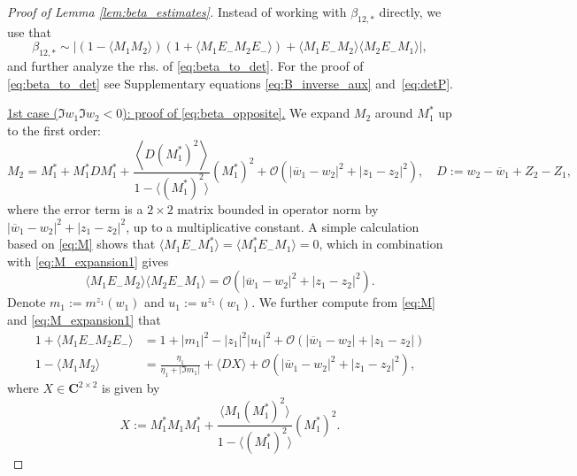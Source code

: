 \documentclass[10pt]{amsart}
\numberwithin{equation}{section}
\newcommand{\C}{\mathbf{C}}
\begin{document}
\begin{proof}[Proof of Lemma \ref{lem:beta_estimates}] Instead of working with $\beta_{12,*}$ directly, we use that
\begin{equation}
\beta_{12,*}\sim \left\vert (1-\langle M_1M_2\rangle)(1+\langle M_1E_-M_2E_-\rangle) + \langle M_1E_-M_2\rangle \langle M_2E_-M_1\rangle \right\vert,
\label{eq:beta_to_det}
\end{equation}
and further analyze the rhs. of \eqref{eq:beta_to_det}. For the proof of \eqref{eq:beta_to_det} see Supplementary equations \eqref{eq:B_inverse_aux} and~\eqref{eq:detP}.

\medskip

\noindent\underline{1st case ($\Im w_1\Im w_2<0$): proof of \eqref{eq:beta_opposite}.} We expand $M_2$ around $M_1^*$ up to the first order:
\begin{equation}
M_2 = M_1^* + M_1^*DM_1^* + \frac{\left\langle D(M_1^*)^2\right\rangle}{1-\langle (M_1^*)^2\rangle} (M_1^*)^2 + \mathcal{O}(|\overline{w}_1-w_2|^2 + |z_1-z_2|^2),\quad D:=w_2-\overline{w}_1 + Z_2-Z_1,
\label{eq:M_expansion1}
\end{equation}
where the error term is a $2\times 2$ matrix bounded in operator norm by $|\overline{w}_1-w_2|^2 + |z_1-z_2|^2$, up to a multiplicative constant. A simple calculation based on \eqref{eq:M} shows that $\langle M_1E_-M_1^*\rangle=\langle M_1^*E_-M_1\rangle=0$, which in combination with \eqref{eq:M_expansion1} gives
\begin{equation}
\langle M_1E_-M_2\rangle \langle M_2E_-M_1\rangle = \mathcal{O}\left(|\overline{w}_1-w_2|^2 + |z_1-z_2|^2\right).
\label{eq:offdiag_terms}
\end{equation}
Denote $m_1:=m^{z_1}(w_1)$ and $u_1:=u^{z_1}(w_1)$. We further compute from \eqref{eq:M} and \eqref{eq:M_expansion1} that
\begin{equation}
\begin{split}
1+ \langle M_1E_-M_2E_-\rangle &= 1+ |m_1|^2 - |z_1|^2 |u_1|^2 + \mathcal{O}\left(|\overline{w}_1-w_2| + |z_1-z_2|\right)\\
1-\langle M_1M_2\rangle &= \frac{\eta_1}{\eta_1+|\Im m_1|} + \langle DX\rangle + \mathcal{O}\left(|\overline{w}_1-w_2|^2 + |z_1-z_2|^2\right),
\end{split}
\label{eq:same_side_factors_exp}
\end{equation}
where $X\in \C^{2\times 2}$ is given by
\begin{equation}
X:=M_1^*M_1M_1^* + \frac{\langle M_1(M_1^*)^2\rangle}{1-\langle (M_1^*)^2\rangle}(M_1^*)^2.

\end{equation}
\end{proof}
\end{document}

